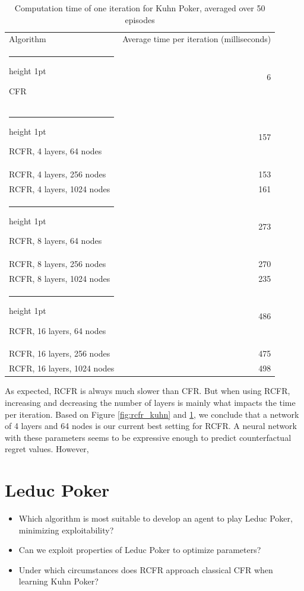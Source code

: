 \documentclass[10pt,a4paper]{article}
\makeatletter
\newcommand{\thickhline}{%
    \noalign {\ifnum 0=`}\fi \hrule height 1pt
    \futurelet \reserved@a \@xhline
}
\makeatother
\begin{document}
\begin{table}
\centering
\begin{tabular}{|l|r|}
\hline
Algorithm & Average time per iteration (milliseconds)\\
\thickhline
CFR & 6 \\
\thickhline
RCFR, 4 layers, 64 nodes& 157 \\
\hline
RCFR, 4 layers, 256 nodes & 153 \\
\hline
RCFR, 4 layers, 1024 nodes & 161 \\
\thickhline
RCFR, 8 layers, 64 nodes & 273 \\
\hline
RCFR, 8 layers, 256 nodes  & 270 \\
\hline
RCFR, 8 layers, 1024 nodes  & 235 \\
\thickhline
RCFR, 16 layers, 64 nodes & 486 \\
\hline
RCFR, 16 layers, 256 nodes & 475 \\
\hline
RCFR, 16 layers, 1024 nodes & 498 \\
\hline
\end{tabular}
\caption{Computation time of one iteration for Kuhn Poker, averaged over 50 episodes}
\label{tbl:kuhn_times}
\end{table}

As expected, RCFR is always much slower than CFR. But when using RCFR, increasing and decreasing the number of layers is mainly what impacts the time per iteration. Based on Figure \ref{fig:rcfr_kuhn} and \ref{tbl:kuhn_times}, we conclude that a network of 4 layers and 64 nodes is our current best setting for RCFR. A neural network with these parameters seems to be expressive enough to predict counterfactual regret values. However, 


 


\section{Leduc Poker}
\begin{tcolorbox}
\begin{itemize}
\item{Which algorithm is most suitable to develop an agent to play Leduc Poker, minimizing exploitability?}
\item{Can we exploit properties of Leduc Poker to optimize parameters?}
\item{Under which circumstances does RCFR approach classical CFR when learning Kuhn Poker?}
\end{itemize}
\end{tcolorbox}
\end{document}
